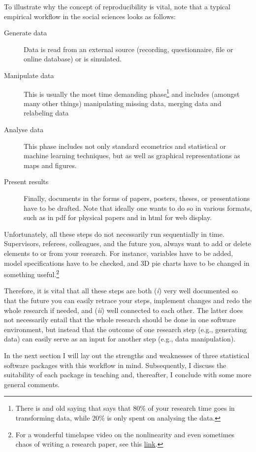 \documentclass[fleqn,10pt]{SelfArx} %
\begin{document}
To illustrate why the concept of reproducibility is vital, note that a typical empirical workflow in the social sciences looks as follows:
\begin{description}
\item[Generate data] Data is read from an external source (recording, questionnaire, file or online database) or is simulated.  
\item[Manipulate data] This is usually the most time demanding
  phase\footnote{There is and old saying that says that 80\% of your research time
  goes in transforming data, while 20\% is only spent on analysing the data.} and
  includes (amongst many other things) manipulating missing data, merging data
  and relabeling data
\item[Analyse data] This phase includes not only standard ecometrics and
  statistical or machine learning techniques, but as well as graphical
  representations as maps and figures. 
\item[Present results] Finally, documents in the forms of papers, posters, theses, or
  presentations have to be drafted. Note that ideally one wants to do so in various
  formats, such as in pdf for physical papers and in html for web display. 
\end{description}
Unfortunately, all these steps do not necessarily run sequentially in time. Supervisors,
referees, colleagues, and the future you, always want to add or delete elements
to or from your research. For instance, variables have to be added,
model specifications have to be checked, and 3D pie charts have to be changed
in something useful.\footnote{For a wonderful timelapse video on the nonlinearity and even sometimes chaos of writing a research paper, see this \href{https://www.youtube.com/watch?v=hNENiG7LAnc}{link}.}

Therefore, it is vital that all these steps are both (\emph{i}) very well
documented so that the future you can easily retrace your steps, implement
changes and redo the whole research if needed, and (\emph{ii}) well connected to
each other. The latter does not necessarily entail that the whole research
should be done in one software environment, but instead that the outcome of one
research step (e.g., generating data) can easily serve as an input for another
step (e.g., data manipulation).

In the next section I will lay out the strengths and weaknesses of three
statistical software packages with this workflow in mind. Subsequently, I discuss the suitability of each package in teaching and, thereafter, I conclude with some more general comments.
\end{document}
